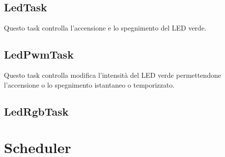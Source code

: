 \subsection{LedTask}
Questo task controlla l'accensione e lo spegnimento del LED verde.

\subsection{LedPwmTask}
Questo task controlla modifica l'intensità del LED verde permettendone l'accensione o lo spegnimento istantaneo o temporizzato.

\subsection{LedRgbTask}


\section{Scheduler}




